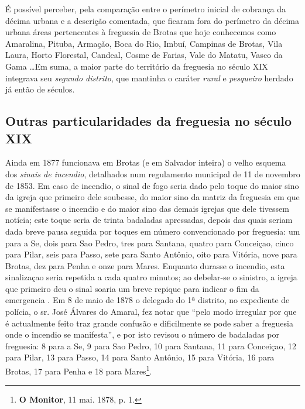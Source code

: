 \begin{enumerate}
\end{enumerate}

É possível perceber, pela comparação entre o perímetro inicial de cobrança da décima urbana e a descrição comentada, que ficaram fora do perímetro da décima urbana áreas pertencentes à freguesia de Brotas que hoje conhecemos como Amaralina, Pituba, Armação, Boca do Rio, Imbuí, Campinas de Brotas, Vila Laura, Horto Florestal, Candeal, Cosme de Farias, Vale do Matatu, Vasco da Gama \dots Em suma, a maior parte do território da freguesia no século XIX integrava seu \textit{segundo distrito}, que mantinha o caráter \textit{rural} e \textit{pesqueiro} herdado já então de séculos.

\subsection{Outras particularidades da freguesia no século XIX}

Ainda em 1877 funcionava em Brotas (e em Salvador inteira) o velho esquema dos \textit{sinais de incendio}, detalhados num regulamento municipal de 11 de novembro de 1853. Em caso de incendio, o sinal de fogo seria dado pelo toque do maior sino da igreja que primeiro dele soubesse, do maior sino da matriz da freguesia em que se manifestasse o incendio e do maior sino das demais igrejas que dele tivessem notícia; este toque seria de trinta badaladas apressadas, depois das quais seriam dada breve pausa seguida por toques em número convencionado por freguesia: um para a Se, dois para Sao Pedro, tres para Santana, quatro para Conceiçao, cinco para Pilar, seis para Passo, sete para Santo Antônio, oito para Vitória, nove para Brotas, dez para Penha e onze para Mares. Enquanto durasse o incendio, esta sinalizaçao seria repetida a cada quatro minutos; ao debelar-se o sinistro, a igreja que primeiro deu o sinal soaria um breve repique para indicar o fim da emergencia \cite[pp.~192-193]{macosta_almana_1877}. Em 8 de maio de 1878 o delegado do 1ª distrito, no expediente de polícia, o sr. José Álvares do Amaral, fez notar que ``pelo modo irregular por que é actualmente feito traz grande confusão e dificilmente se pode saber a freguesia onde o incendio se manifesta'', e por isto revisou o número de badaladas por freguesia: 8 para a Se, 9 para Sao Pedro, 10 para Santana, 11 para Conceiçao, 12 para Pilar, 13 para Passo, 14 para Santo Antônio, 15 para Vitória, 16 para Brotas, 17 para Penha e 18 para Mares\footnote{\textbf{O Monitor}, 11 mai. 1878, p. 1.}.